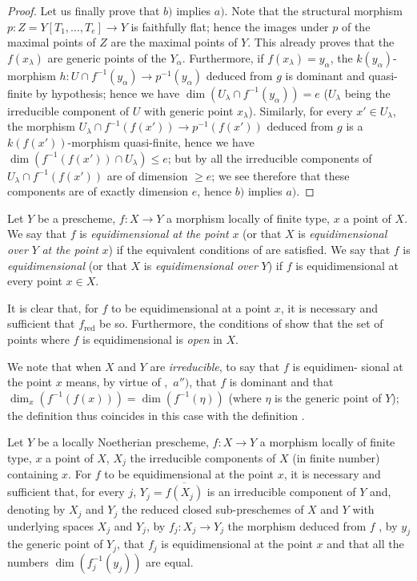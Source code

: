 \begin{proof}
Let us finally prove that $b)$ implies $a)$.
Note that the structural morphism $p:Z=Y[T_1,\ldots,T_e]\to Y$ is faithfully flat; hence  the images under $p$ of the maximal points of $Z$ are the maximal points of $Y$. This already proves that the $f(x_\lambda)$ are generic points of the $Y_\alpha$.
Furthermore, if $f(x_\lambda)=y_\alpha$, the $k(y_\alpha)$-morphism $h:U\cap f^{-1}(y_\alpha)\to p^{-1}(y_\alpha)$ deduced from $g$ is dominant and quasi-finite by hypothesis; hence  we have $\dim(U_\lambda\cap f^{-1}(y_\alpha))=e$ ($U_\lambda$ being the irreducible component of $U$ with generic point $x_\lambda$).
Similarly, for every $x'\in U_\lambda$, the morphism $U_\lambda\cap f^{-1}(f(x'))\to p^{-1}(f(x'))$ deduced from $g$ is a $k(f(x'))$-morphism quasi-finite, hence  we have $\dim(f^{-1}(f(x'))\cap U_\lambda)\leq e$; but by  all the irreducible components of $U_\lambda\cap f^{-1}(f(x'))$ are of dimension $\geq e$; we see therefore that these components are of exactly dimension $e$, hence $b)$ implies $a)$.
\end{proof}

\begin{definition}[13.3.2]
\label{IV.13.3.2}
Let $Y$ be a prescheme, $f:X\to Y$ a morphism locally of finite type, $x$ a point of $X$.
We say that $f$ is \emph{equidimensional at the point} $x$ (or that $X$ is \emph{equidimensional over} $Y$ \emph{at the point} $x$) if the equivalent conditions of  are satisfied.
We say that $f$ is \emph{equidimensional} (or that $X$ is \emph{equidimensional over} $Y$) if $f$ is equidimensional at every point $x\in X$.
\end{definition}

It is clear that, for $f$ to be equidimensional at a point $x$, it is necessary and sufficient that $f_{\mathrm{red}}$ be so.
Furthermore, the conditions of  show that the set of points where $f$ is equidimensional is \emph{open} in $X$.

We note that when $X$ and $Y$ are \emph{irreducible}, to say that $f$ is equidimen-
sional at the point $x$ means, by virtue of ,~$a'')$, that $f$ is dominant and that $\dim_x(f^{-1}(f(x)))=\dim(f^{-1}(\eta))$ (where $\eta$ is the generic point of $Y$); the definition  thus coincides in this case with the definition .

\begin{proposition}[13.3.3]
\label{IV.13.3.3}
Let $Y$ be a locally Noetherian prescheme, $f:X\to Y$ a morphism locally of finite type, $x$ a point of $X$, $X_j$ the irreducible components of $X$ (in finite number) containing $x$.
For $f$ to be equidimensional at the point $x$, it is necessary and sufficient that, for every $j$, $Y_j=\overline{f(X_j)}$ is an irreducible component of $Y$ and, denoting by $X_j$ and $Y_j$ the reduced closed sub-preschemes of $X$ and $Y$ with underlying spaces $X_j$ and $Y_j$, by $f_j:X_j\to Y_j$ the morphism deduced from $f$ , by $y_j$ the generic point of $Y_j$, that $f_j$ is equidimensional at the point $x$ and that all the numbers $\dim(f_j^{-1}(y_j))$ are equal.
\end{proposition}

